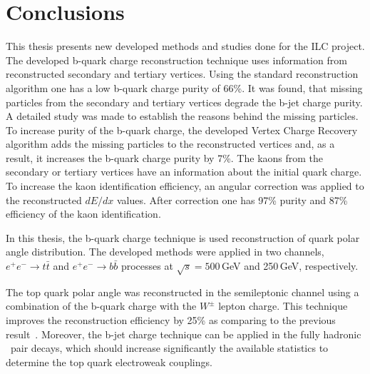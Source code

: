 \section*{Conclusions}
This thesis presents new developed methods and studies done for the ILC project.
The developed b-quark charge reconstruction technique uses information from reconstructed secondary and tertiary vertices. 
Using the standard reconstruction algorithm one has a low b-quark charge purity of 66\%.
It was found, that missing particles from the secondary and tertiary vertices degrade the b-jet charge purity. 
A detailed study was made to establish the reasons behind the missing particles. 
To increase purity of the b-quark charge, the developed Vertex Charge Recovery algorithm adds the missing particles to the reconstructed vertices and, as a result, it increases the b-quark charge purity by 7\%.
The kaons from the secondary or tertiary vertices have an information about the initial quark charge. 
To increase the kaon identification efficiency, an angular correction was applied to the reconstructed $dE/dx$ values. 
After correction one has 97\% purity and 87\% efficiency of the kaon identification.

In this thesis, the b-quark charge technique is used reconstruction of quark polar angle distribution.
The developed methods were applied in two channels, $e^+e^-\to t\bar{t}$ and $e^+e^-\to b\bar{b}$ processes at $\sqrt{s} = 500$\,GeV and 250\,GeV, respectively.

The top quark polar angle was reconstructed in the semileptonic channel using a combination of the b-quark charge with the $W^\pm$ lepton charge. 
This technique improves the reconstruction efficiency by 25\% as comparing to the previous result~\cite{bib:ILCTOP}.
Moreover, the b-jet charge technique can be applied in the fully hadronic \ttbar\ pair decays, which should increase significantly the available statistics to determine the top quark electroweak couplings. 

